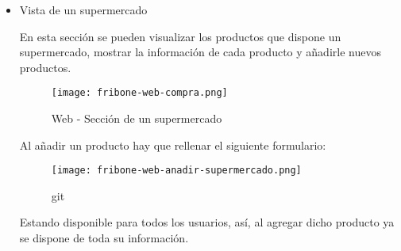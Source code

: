 \begin{itemize}
\begin{itemize}
                \item Vista de un supermercado

                    En esta sección se pueden visualizar los productos que dispone un supermercado, mostrar la información de cada producto y añadirle nuevos productos.

                    \begin{figure}[H]
                        \centering
                        \texttt{[image: fribone-web-compra.png]}
                        \caption{Web - Sección de un supermercado}\label{fig:fribone-web-supermercado}
                    \end{figure}

                    Al añadir un producto hay que rellenar el siguiente formulario:

                    \begin{figure}[H]
                        \centering
                        \texttt{[image: fribone-web-anadir-supermercado.png]}
                        \caption{git }\label{fig:fribone-web-anadir-supermercado}
                    \end{figure}

                    Estando disponible para todos los usuarios, así, al agregar dicho producto ya se dispone de toda su información.
            \end{itemize}
    \end{itemize}